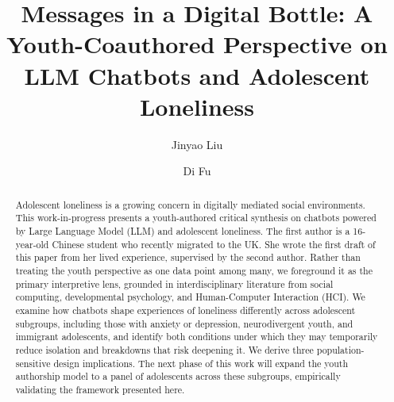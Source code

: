 \documentclass[manuscript]{acmart}
\begin{document}
\title{Messages in a Digital Bottle: A Youth-Coauthored Perspective on LLM Chatbots and Adolescent Loneliness}

\author{Jinyao Liu}

\author{Di Fu}



\renewcommand{\shortauthors}{Liu et al.}

\begin{abstract}
Adolescent loneliness is a growing concern in digitally mediated social environments. This work-in-progress presents a youth-authored critical synthesis on chatbots powered by Large Language Model (LLM) and adolescent loneliness. The first author is a 16-year-old Chinese student who recently migrated to the UK. She wrote the first draft of this paper from her lived experience, supervised by the second author. Rather than treating the youth perspective as one data point among many, we foreground it as the primary interpretive lens, grounded in interdisciplinary literature from social computing, developmental psychology, and Human-Computer Interaction (HCI). We examine how chatbots shape experiences of loneliness differently across adolescent subgroups, including those with
anxiety or depression, neurodivergent youth, and immigrant adolescents, and identify both
conditions under which they may temporarily reduce isolation and breakdowns that risk
deepening it. We derive three population-sensitive design implications. The next phase of
this work will expand the youth authorship model to a panel of adolescents across these
subgroups, empirically validating the framework presented here.
\end{abstract}
\end{document}
